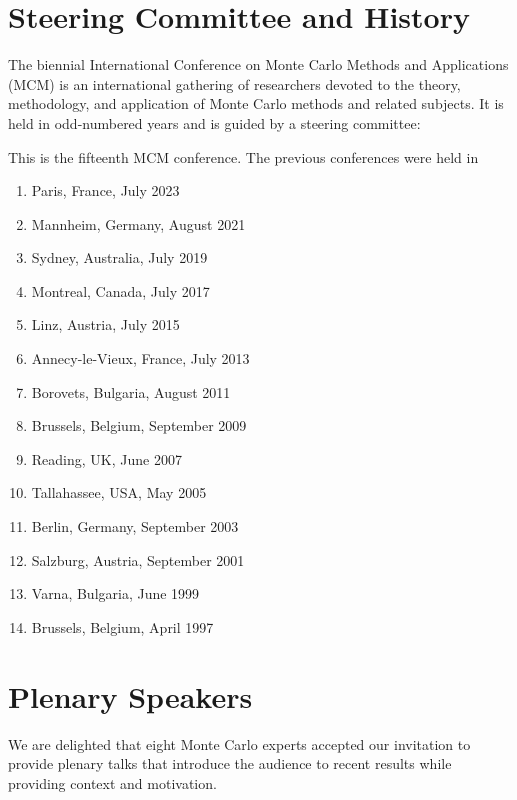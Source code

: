 

\section{Steering Committee and History} \label{steer_com}


The biennial International Conference on Monte Carlo Methods and Applications (MCM) is an international gathering of researchers devoted to the theory, methodology, and application of Monte Carlo methods and related subjects. It is held in odd-numbered years and is guided by a steering committee:



This is the fifteenth MCM conference.  The previous  conferences were held in
\begin{enumerate}
\item Paris, France, July 2023
\item Mannheim, Germany, August 2021
\item Sydney, Australia, July 2019
\item Montreal, Canada, July 2017
\item Linz, Austria, July 2015
\item Annecy-le-Vieux, France, July 2013
\item Borovets, Bulgaria, August 2011
\item Brussels, Belgium, September 2009
\item Reading, UK, June 2007
\item Tallahassee, USA, May 2005
\item Berlin, Germany, September 2003
\item Salzburg, Austria, September 2001
\item Varna, Bulgaria, June 1999
\item Brussels, Belgium, April 1997
\end{enumerate}

\section{Plenary Speakers} \label{plenary_speakers}

We are delighted that eight Monte Carlo experts accepted our invitation to provide plenary talks that introduce the audience to recent results while providing context and motivation.

